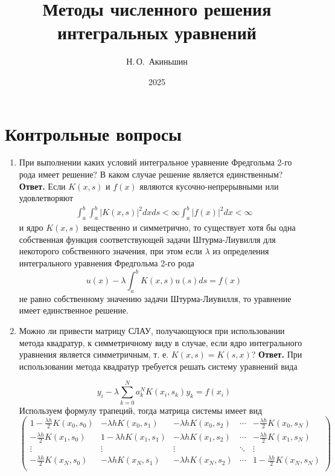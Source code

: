 \documentclass{article}
\title{Методы численного решения
интегральных уравнений}
\author{Н.\,О.~Акиньшин}
\date{2025}
\begin{document}
    \maketitle
    \newpage
    \tableofcontents
    \newpage

    \section{Контрольные вопросы}
	\begin{enumerate}
		\item При выполнении каких условий интегральное уравнение
		Фредгольма 2-го рода имеет решение? В каком случае
		решение является единственным?
		\newline
		{\bfseries Ответ. } 
		Если $K(x, s)$ и $f(x)$ являются кусочно-непрерывными или удовлетворяют 
		\begin{gather*}
			\int_{a}^{b} \int_{a}^{b} |K(x, s)|^2 dx ds < \infty
			\int_{a}^{b}|f(x)|^2 dx < \infty
		\end{gather*}
		и ядро $K(x, s)$ вещественно и симметрично, то существует 
		хотя бы одна собственная функция соответствующей задачи Штурма-Лиувилля для 
		некоторого собственного значения, при этом если $\lambda$ из 
		определения интегрального уравнения Фредгольма 2-го рода 
		\begin{equation*}
			u(x) - \lambda \int_{a}^{b}K(x,s)u(s)ds = f(x)
		\end{equation*}
		не равно собственному значению задачи Штурма-Лиувилля, то уравнение имеет единственное решение.
		\item Можно ли привести матрицу СЛАУ, получающуюся при
		использовании метода квадратур, к симметричному виду
		в случае, если ядро интегрального уравнения является
		симметричным, т. е. $K(x, s) = K(s, x)$?
		\newline
		{\bfseries Ответ. } 
При использовании метода квадратур требуется решать систему уравнений вида
	
	
	\[
	y_i - \lambda \sum_{k=0}^{N} a_k^N K(x_i, s_k) y_k = f(x_i)
	\]
	Используем формулу трапеций, тогда матрица системы имеет вид
	\[
	\begin{pmatrix}
		1-\frac{\lambda h}{2} K(x_0, s_0) & -\lambda h K(x_0, s_1) & -\lambda h K(x_0, s_2) & \cdots & -\frac{\lambda h}{2} K(x_0, s_N) \\
		-\frac{\lambda h}{2} K(x_1, s_0) & 1-\lambda h K(x_1, s_1) & -\lambda h K(x_1, s_2) & \cdots & -\frac{\lambda h}{2} K(x_1, s_N) \\
		\vdots & \vdots & \vdots & \ddots & \vdots \\
		-\frac{\lambda h}{2} K(x_N, s_0) & -\lambda h K(x_N, s_1) & -\lambda h K(x_N, s_2) & \cdots & 1-\frac{\lambda h}{2} K(x_N, s_N) \\
	\end{pmatrix}
	\]


\end{enumerate}
\end{document}
